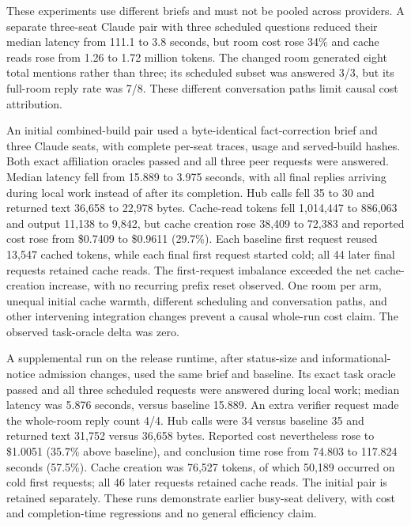 These experiments use different briefs and must not be pooled across providers. A separate three-seat Claude pair with three scheduled questions reduced their median latency from 111.1 to 3.8 seconds, but room cost rose 34\% and cache reads rose from 1.26 to 1.72 million tokens. The changed room generated eight total mentions rather than three; its scheduled subset was answered 3/3, but its full-room reply rate was 7/8. These different conversation paths limit causal cost attribution.

An initial combined-build pair used a byte-identical fact-correction brief and three Claude seats, with complete per-seat traces, usage and served-build hashes. Both exact affiliation oracles passed and all three peer requests were answered. Median latency fell from 15.889 to 3.975 seconds, with all final replies arriving during local work instead of after its completion. Hub calls fell 35 to 30 and returned text 36,658 to 22,978 bytes. Cache-read tokens fell 1,014,447 to 886,063 and output 11,138 to 9,842, but cache creation rose 38,409 to 72,383 and reported cost rose from \$0.7409 to \$0.9611 (29.7\%). Each baseline first request reused 13,547 cached tokens, while each final first request started cold; all 44 later final requests retained cache reads. The first-request imbalance exceeded the net cache-creation increase, with no recurring prefix reset observed. One room per arm, unequal initial cache warmth, different scheduling and conversation paths, and other intervening integration changes prevent a causal whole-run cost claim. The observed task-oracle delta was zero.

A supplemental run on the release runtime, after status-size and informational-notice admission changes, used the same brief and baseline. Its exact task oracle passed and all three scheduled requests were answered during local work; median latency was 5.876 seconds, versus baseline 15.889. An extra verifier request made the whole-room reply count 4/4. Hub calls were 34 versus baseline 35 and returned text 31,752 versus 36,658 bytes. Reported cost nevertheless rose to \$1.0051 (35.7\% above baseline), and conclusion time rose from 74.803 to 117.824 seconds (57.5\%). Cache creation was 76,527 tokens, of which 50,189 occurred on cold first requests; all 46 later requests retained cache reads. The initial pair is retained separately. These runs demonstrate earlier busy-seat delivery, with cost and completion-time regressions and no general efficiency claim.

